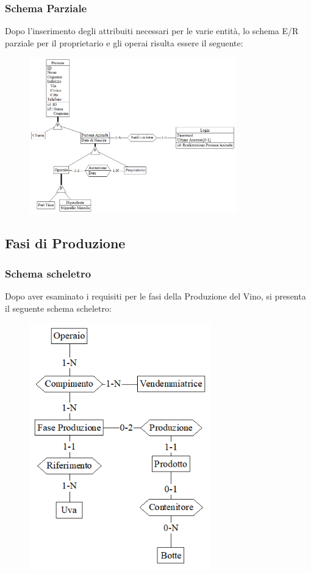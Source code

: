 \documentclass{article}
\begin{document}
\subsubsection{Schema Parziale}
Dopo l'inserimento degli attribuiti necessari per le varie entità, lo schema E/R parziale per  il proprietario e gli operai risulta essere il seguente:
\begin{figure}[htbp]
\centering
\includegraphics[width=0.8\textwidth]{img/Persone_Parziale.png}
\end{figure}
\newpage
\subsection{Fasi di Produzione}

\subsubsection{Schema scheletro}
Dopo aver esaminato i requisiti per le fasi della Produzione del Vino, si presenta il seguente schema scheletro:
\begin{figure}[htbp]
\centering
\includegraphics[width=0.7\textwidth]{img/Fasi_Scheletro}
\end{figure}
\end{document}
